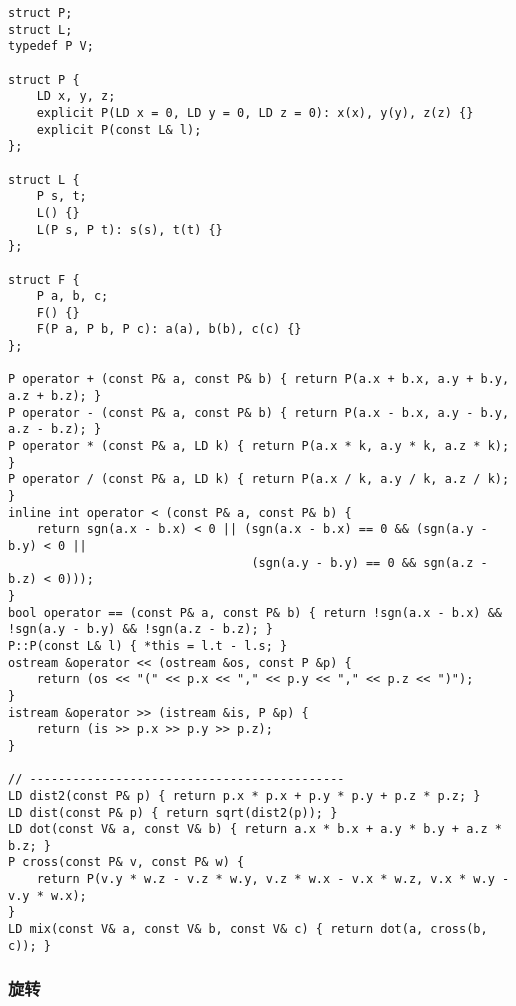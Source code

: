 \documentclass[]{article}
\begin{document}
\begin{verbatim}
struct P;
struct L;
typedef P V;

struct P {
    LD x, y, z;
    explicit P(LD x = 0, LD y = 0, LD z = 0): x(x), y(y), z(z) {}
    explicit P(const L& l);
};

struct L {
    P s, t;
    L() {}
    L(P s, P t): s(s), t(t) {}
};

struct F {
    P a, b, c;
    F() {}
    F(P a, P b, P c): a(a), b(b), c(c) {}
};

P operator + (const P& a, const P& b) { return P(a.x + b.x, a.y + b.y, a.z + b.z); }
P operator - (const P& a, const P& b) { return P(a.x - b.x, a.y - b.y, a.z - b.z); }
P operator * (const P& a, LD k) { return P(a.x * k, a.y * k, a.z * k); }
P operator / (const P& a, LD k) { return P(a.x / k, a.y / k, a.z / k); }
inline int operator < (const P& a, const P& b) {
    return sgn(a.x - b.x) < 0 || (sgn(a.x - b.x) == 0 && (sgn(a.y - b.y) < 0 ||
                                  (sgn(a.y - b.y) == 0 && sgn(a.z - b.z) < 0)));
}
bool operator == (const P& a, const P& b) { return !sgn(a.x - b.x) && !sgn(a.y - b.y) && !sgn(a.z - b.z); }
P::P(const L& l) { *this = l.t - l.s; }
ostream &operator << (ostream &os, const P &p) {
    return (os << "(" << p.x << "," << p.y << "," << p.z << ")");
}
istream &operator >> (istream &is, P &p) {
    return (is >> p.x >> p.y >> p.z);
}

// --------------------------------------------
LD dist2(const P& p) { return p.x * p.x + p.y * p.y + p.z * p.z; }
LD dist(const P& p) { return sqrt(dist2(p)); }
LD dot(const V& a, const V& b) { return a.x * b.x + a.y * b.y + a.z * b.z; }
P cross(const P& v, const P& w) {
    return P(v.y * w.z - v.z * w.y, v.z * w.x - v.x * w.z, v.x * w.y - v.y * w.x);
}
LD mix(const V& a, const V& b, const V& c) { return dot(a, cross(b, c)); }
\end{verbatim}

\hypertarget{ux65cbux8f6c}{%
\subsubsection{旋转}\label{ux65cbux8f6c}}
\end{document}

